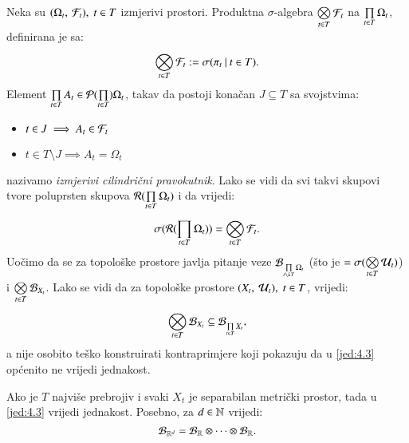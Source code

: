 Neka su $(\Omega_t, \: \mathcal{F}_t), \; t \in T$ izmjerivi prostori.
Produktna $\sigma$-algebra $\bigotimes\limits_{t \in T}^{} \mathcal{F}_t$ na $\prod\limits_{t \in T}^{} \Omega_t$, definirana je sa:
\begin{equation}    \label{jed:4.1}
    \bigotimes\limits_{t \in T}^{} \mathcal{F}_t := \sigma({\pi_t} \: | \: {t \in T}).
\end{equation} 
Element $\prod\limits_{t \in T}^{} A_t \in \mathcal{P}({\prod\limits_{t \in T}^{}}) \Omega_t$, takav da postoji kona\v can $J \subseteq T$ sa svojstvima:
\begin{itemize}[label=]
    \item $t \in J \implies A_t \in \mathcal{F}_t$
    \item $ t \in T \setminus J \implies A_t = \Omega_t $
\end{itemize}
nazivamo \emph{izmjerivi cilindri\v cni pravokutnik}.
Lako se vidi da svi takvi skupovi tvore poluprsten skupova $\mathcal{R}({\prod\limits_{t \in T}^{} \Omega_t})$ i da vrijedi:
\begin{equation}    \label{jed:4.2}
    \sigma({\mathcal{R}({\prod\limits_{t \in T}^{} \Omega_t})}) = \bigotimes\limits_{t \in T}^{} \mathcal{F}_t.
\end{equation}
Uo\v cimo da se za topolo\v ske prostore javlja pitanje veze $\borel{\produkt{t \i T}{} \Omega_t}$ (\v sto je $= \sigma({\bigotimes\limits_{t \in T}^{} \mathcal{U}_t})$) i $\bigotimes\limits_{t \in T}^{} \mathcal{B}_{X_t}$.
Lako se vidi da za topolo\v ske prostore $(X_t, \: \mathcal{U}_t), \; t \in T$, vrijedi:
\begin{equation}    \label{jed:4.3}
    \bigotimes\limits_{t \in T}^{} \mathcal{B}_{X_t} \subseteq \mathcal{B}_{\prod\limits_{t \in T}^{} X_t},
\end{equation}
a nije osobito te\v sko konstruirati kontraprimjere koji pokazuju da u \eqref{jed:4.3} op\' cenito ne vrijedi jednakost.

\begin{zad} \label{zad:4.4}
    Ako je $T$ najvi\v se prebrojiv i svaki $X_t$ je separabilan metri\v cki prostor, tada u \eqref{jed:4.3} vrijedi jednakost.
    Posebno, za $d \in \mathbb{N}$ vrijedi:
    \begin{equation}    \label{jed:4.5}
        \mathcal{B}_{\mathbb{R}^d} = \mathcal{B}_{\mathbb{R}} \otimes \dots \otimes \mathcal{B}_{\mathbb{R}}.
    \end{equation}
\end{zad}